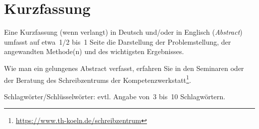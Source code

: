 \chapter*{Kurzfassung}
\label{chap:kurzfassung}
%
Eine Kurzfassung (wenn verlangt) in Deutsch und/oder in Englisch (\emph{Abstract}) umfasst auf etwa~1/2 bis~1 Seite die Darstellung der Problemstellung, der angewandten Methode(n) und des wichtigsten Ergebnisses.
\par
Wie man ein gelungenes Abstract verfasst, erfahren Sie in den Seminaren oder der Beratung des Schreibzentrums der Kompetenzwerkstatt\footnote{\href{https://www.th-koeln.de/schreibzentrum}{https://www.th-koeln.de/schreibzentrum}}.
\par
Schlagwörter/Schlüsselwörter: evtl. Angabe von~3 bis~10 Schlagwörtern.